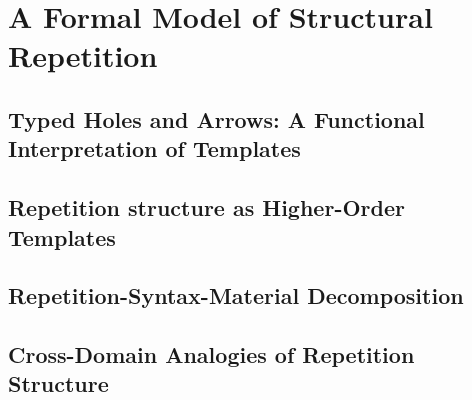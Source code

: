 \section{A Formal Model of Structural Repetition}
        \subsection{Typed Holes and Arrows: A Functional Interpretation of Templates}
        \subsection{Repetition structure as Higher-Order Templates}
        \subsection{Repetition-Syntax-Material Decomposition}
        \subsection{Cross-Domain Analogies of Repetition Structure}
